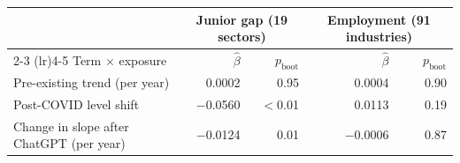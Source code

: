 \begin{tabular}{lrrrr}
\toprule
 & \multicolumn{2}{c}{Junior gap (19 sectors)} & \multicolumn{2}{c}{Employment (91 industries)} \\
\cmidrule(lr){2-3} \cmidrule(lr){4-5}
Term $\times$ exposure & $\hat\beta$ & $p_{\text{boot}}$ & $\hat\beta$ & $p_{\text{boot}}$ \\
\midrule
Pre-existing trend (per year) & 0.0002 & 0.95 & 0.0004 & 0.90 \\
Post-COVID level shift & $-$0.0560 & $<$0.01 & 0.0113 & 0.19 \\
Change in slope after ChatGPT (per year) & $-$0.0124 & 0.01 & $-$0.0006 & 0.87 \\
\bottomrule
\end{tabular}
